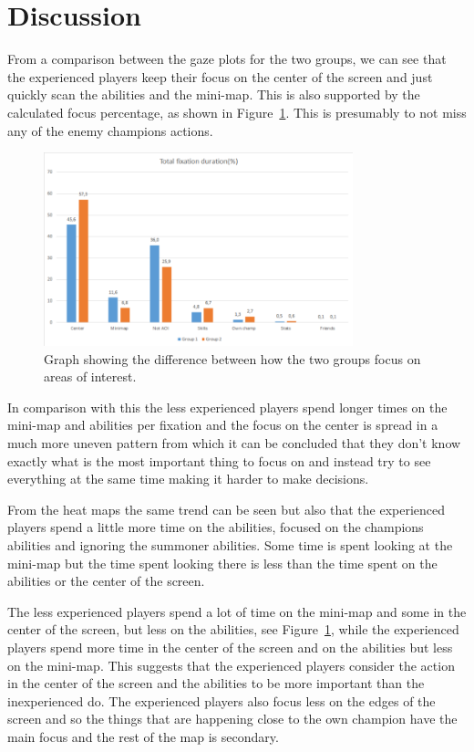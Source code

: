 \documentclass{report}
\begin{document}
\section{Discussion}
From a comparison between the gaze plots for the two groups, we can see that the experienced players keep their focus on the center of the screen and just quickly scan the abilities and the mini-map. This is also supported by the calculated focus percentage, as shown in Figure~\ref{aoi}. This is presumably to not miss any of the enemy champions actions.

\begin{figure}[h]
\centering
\includegraphics[width=0.8\textwidth]{images/AOIChart}
\caption{Graph showing the difference between how the two groups focus on areas of interest.}
\label{aoi}
\end{figure}

In comparison with this the less experienced players spend longer times on the mini-map and abilities per fixation and the focus on the center is spread in a much more uneven pattern from which it can be concluded that they don't know exactly what is the most important thing to focus on and instead try to see everything at the same time making it harder to make decisions.

From the heat maps the same trend can be seen but also that the experienced players spend a little more time on the abilities, focused on the champions abilities and ignoring the summoner abilities. Some time is spent looking at the mini-map but the time spent looking there is less than the time spent on the abilities or the center of the screen.

The less experienced players spend a lot of time on the mini-map and some in the center of the screen, but less on the abilities, see Figure~\ref{aoi}, while the experienced players spend more time in the center of the screen and on the abilities but less on the mini-map. This suggests that the experienced players consider the action in the center of the screen and the abilities to be more important than the inexperienced do. The experienced players also focus less on the edges of the screen and so the things that are happening close to the own champion have the main focus and the rest of the map is secondary.
\end{document}
